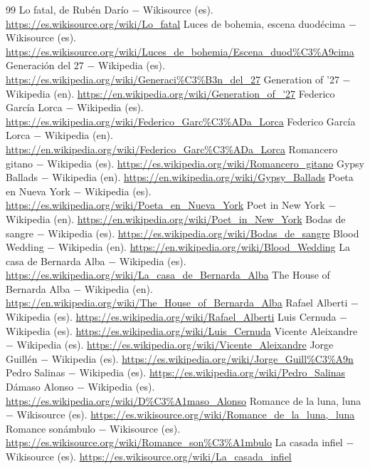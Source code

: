 \documentclass{book}
\begin{document}
\begin{thebibliography}{99}
 Lo fatal, de Rubén Darío \(-\) Wikisource (es). \url{https://es.wikisource.org/wiki/Lo_fatal}
 Luces de bohemia, escena duodécima \(-\) Wikisource (es). \url{https://es.wikisource.org/wiki/Luces_de_bohemia/Escena_duod%C3%A9cima}
 Generación del 27 \(-\) Wikipedia (es). \url{https://es.wikipedia.org/wiki/Generaci%C3%B3n_del_27}
 Generation of '27 \(-\) Wikipedia (en). \url{https://en.wikipedia.org/wiki/Generation_of_'27}
 Federico García Lorca \(-\) Wikipedia (es). \url{https://es.wikipedia.org/wiki/Federico_Garc%C3%ADa_Lorca}
 Federico García Lorca \(-\) Wikipedia (en). \url{https://en.wikipedia.org/wiki/Federico_Garc%C3%ADa_Lorca}
 Romancero gitano \(-\) Wikipedia (es). \url{https://es.wikipedia.org/wiki/Romancero_gitano}
 Gypsy Ballads \(-\) Wikipedia (en). \url{https://en.wikipedia.org/wiki/Gypsy_Ballads}
 Poeta en Nueva York \(-\) Wikipedia (es). \url{https://es.wikipedia.org/wiki/Poeta_en_Nueva_York}
 Poet in New York \(-\) Wikipedia (en). \url{https://en.wikipedia.org/wiki/Poet_in_New_York}
 Bodas de sangre \(-\) Wikipedia (es). \url{https://es.wikipedia.org/wiki/Bodas_de_sangre}
 Blood Wedding \(-\) Wikipedia (en). \url{https://en.wikipedia.org/wiki/Blood_Wedding}
 La casa de Bernarda Alba \(-\) Wikipedia (es). \url{https://es.wikipedia.org/wiki/La_casa_de_Bernarda_Alba}
 The House of Bernarda Alba \(-\) Wikipedia (en). \url{https://en.wikipedia.org/wiki/The_House_of_Bernarda_Alba}
 Rafael Alberti \(-\) Wikipedia (es). \url{https://es.wikipedia.org/wiki/Rafael_Alberti}
 Luis Cernuda \(-\) Wikipedia (es). \url{https://es.wikipedia.org/wiki/Luis_Cernuda}
 Vicente Aleixandre \(-\) Wikipedia (es). \url{https://es.wikipedia.org/wiki/Vicente_Aleixandre}
 Jorge Guillén \(-\) Wikipedia (es). \url{https://es.wikipedia.org/wiki/Jorge_Guill%C3%A9n}
 Pedro Salinas \(-\) Wikipedia (es). \url{https://es.wikipedia.org/wiki/Pedro_Salinas}
 Dámaso Alonso \(-\) Wikipedia (es). \url{https://es.wikipedia.org/wiki/D%C3%A1maso_Alonso}
 Romance de la luna, luna \(-\) Wikisource (es). \url{https://es.wikisource.org/wiki/Romance_de_la_luna,_luna}
 Romance sonámbulo \(-\) Wikisource (es). \url{https://es.wikisource.org/wiki/Romance_son%C3%A1mbulo}
 La casada infiel \(-\) Wikisource (es). \url{https://es.wikisource.org/wiki/La_casada_infiel}

\end{thebibliography}
\end{document}
